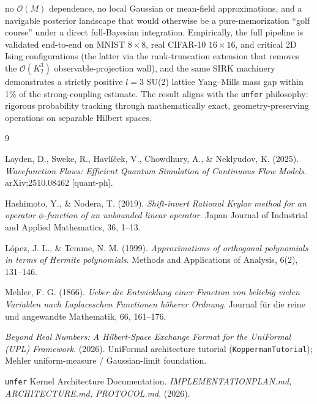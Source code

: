 \documentclass[11pt, a4paper]{article}
\begin{document}
no $\mathcal{O}(M)$ dependence, no local Gaussian or mean-field
approximations, and a navigable posterior landscape that would otherwise be
a pure-memorization ``golf course'' under a direct full-Bayesian
integration. Empirically, the full pipeline is validated end-to-end on
MNIST $8\times 8$, real CIFAR-10 $16\times 16$, and critical 2D Ising
configurations (the latter via the rank-truncation extension that removes
the $\mathcal{O}(K_2^3)$ observable-projection wall), and the same SIRK
machinery demonstrates a strictly positive $l=3$ SU(2) lattice Yang--Mills
mass gap within 1\% of the strong-coupling estimate. The result aligns with
the \texttt{unfer} philosophy: rigorous
probability tracking through mathematically exact, geometry-preserving
operations on
separable Hilbert spaces.

\vspace{1em}
\begin{thebibliography}{9}

Layden, D., Sweke, R., Havl\'i\v{c}ek, V., Chowdhury, A., \& Neklyudov, K.
(2025). \textit{Wavefunction Flows: Efficient Quantum Simulation of Continuous
Flow Models}. arXiv:2510.08462 [quant-ph].

Hashimoto, Y., \& Nodera, T. (2019). \textit{Shift-invert Rational Krylov
method for an operator $\phi$-function of an unbounded linear operator}.
Japan Journal of Industrial and Applied Mathematics, 36, 1--13.

L\'opez, J. L., \& Temme, N. M. (1999). \textit{Approximations of orthogonal
polynomials in terms of Hermite polynomials}. Methods and Applications of
Analysis, 6(2), 131--146.

Mehler, F. G. (1866). \textit{Ueber die Entwicklung einer Function von
beliebig vielen Variablen nach Laplaceschen Functionen h\"oherer Ordnung}.
Journal f\"ur die reine und angewandte Mathematik, 66, 161--176.

\textit{Beyond Real Numbers: A Hilbert-Space Exchange Format for the UniFormal
(UPL) Framework}. (2026). UniFormal architecture tutorial
(\texttt{Kopperman\textunderscore Tutorial}); Mehler uniform-measure /
Gaussian-limit foundation.

\texttt{unfer} Kernel Architecture Documentation.
\textit{IMPLEMENTATION\textunderscore PLAN.md, ARCHITECTURE.md, PROTOCOL.md}.
(2026).

\end{thebibliography}
\end{document}
